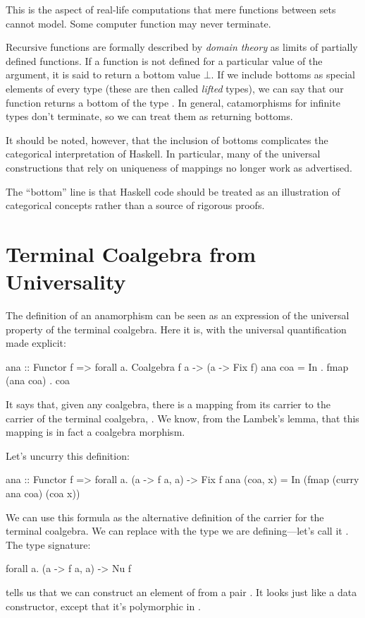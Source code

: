 \documentclass[DaoFP]{subfiles}
\begin{document}
This is the aspect of real-life computations that mere functions between sets cannot model. Some computer function may never terminate. 

Recursive functions are formally described by \emph{domain theory} as limits of partially defined functions. If a function is not defined for a particular value of the argument, it is said to return a bottom value $\bot$. If we include bottoms as special elements of every type (these are then called \emph{lifted} types), we can say that our function  returns a bottom of the type . In general, catamorphisms for infinite types don't terminate, so we can treat them as returning bottoms.

It should be noted, however, that the inclusion of bottoms complicates the categorical interpretation of Haskell. In particular, many of the universal constructions that rely on uniqueness of mappings no longer work as advertised.

The ``bottom'' line is that Haskell code should be treated as an illustration of categorical concepts rather than a source of rigorous proofs.

\section{Terminal Coalgebra from Universality}

The definition of an anamorphism can be seen as an expression of the universal property of the terminal coalgebra. Here it is, with the universal quantification made explicit:
 \begin{haskell}
ana :: Functor f => forall a. Coalgebra f a -> (a -> Fix f)
ana coa = In . fmap (ana coa) . coa 
\end{haskell}
It says that, given any coalgebra, there is a mapping from its carrier to the carrier of the terminal coalgebra, . We know, from the Lambek's lemma, that this mapping is in fact a coalgebra morphism.

Let's uncurry this definition:
\begin{haskell}
ana :: Functor f => forall a. (a -> f a, a) -> Fix f
ana (coa, x) = In (fmap (curry ana coa) (coa x))
\end{haskell}
We can use this formula as the alternative definition of the carrier for the terminal coalgebra. We can replace  with the type we are defining---let's call it . The type signature:
\begin{haskell}
forall a. (a -> f a, a) -> Nu f
\end{haskell}
tells us that we can construct an element of  from a pair . It looks just like a data constructor, except that it's polymorphic in . 
\end{document}
